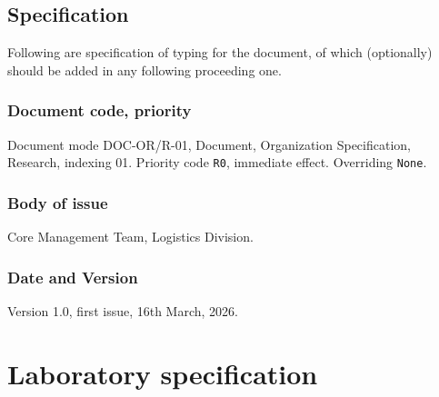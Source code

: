 \documentclass[9pt,a4paper]{article}
\begin{document}
\subsection{Specification}

Following are specification of typing for the document, of which (optionally) should be added in any following proceeding one. 
\subsubsection{Document code, priority}
Document mode DOC-OR/R-01, Document, Organization Specification, Research, indexing 01. Priority code \texttt{R0}, immediate effect. Overriding \texttt{None}. 
\subsubsection{Body of issue}
Core Management Team, Logistics Division. 
\subsubsection{Date and Version}
Version 1.0, first issue, 16th March, 2026. 
\tableofcontents

\section{Laboratory specification}
\end{document}

